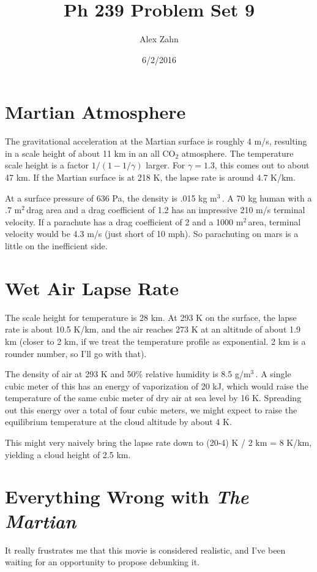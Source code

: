 \documentclass[12pt]{article}
\title{Ph 239 Problem Set 9}
\author{Alex Zahn}
\date{6/2/2016}
\begin{document}
\maketitle

\newcommand{\wmsq}{W/\(\mathrm{m}^2\,\)}
\newcommand{\msq}{\(\mathrm{m}^2\,\)}
\newcommand{\micron}{\(\mu\mathrm{m}\)\,}
\newcommand{\mcb}{\(\mathrm{m}^3\,\)}

\section{Martian Atmosphere}

The gravitational acceleration at the Martian surface is roughly 4 m/s, resulting in a scale height of about 11 km in an all CO\(_2\) atmosphere. The temperature scale height is a factor \(1/(1-1/\gamma)\) larger. For \(\gamma = 1.3\), this comes out to about 47 km. If the Martian surface is at 218 K, the lapse rate is around 4.7 K/km.

At a surface pressure of 636 Pa, the density is .015 kg \mcb. A 70 kg human with a .7 \msq drag area and a drag coefficient of 1.2 has an impressive 210 m/s terminal velocity. If a parachute has a drag coefficient of 2 and a 1000 \msq area, terminal velocity would be 4.3 m/s (just short of 10 mph). So parachuting on mars is a little on the inefficient side.

\section{Wet Air Lapse Rate}

The scale height for temperature is 28 km. At 293 K on the surface, the lapse rate is about 10.5 K/km, and the air reaches 273 K at an altitude of about 1.9 km (closer to 2 km, if we treat the temperature profile as exponential. 2 km is a rounder number, so I'll go with that).

The density of air at 293 K and 50\% relative humidity is 8.5 g/\mcb. A single cubic meter of this has an energy of vaporization of 20 kJ, which would raise the temperature of the same cubic meter of dry air at sea level by 16 K. Spreading out this energy over a total of four cubic meters, we might expect to raise the equilibrium temperature at the cloud altitude by about 4 K.

This might very naively bring the lapse rate down to (20-4) K / 2 km = 8 K/km, yielding a cloud height of 2.5 km.



\section{Everything Wrong with \textit{The Martian}}

It really frustrates me that this movie is considered realistic, and I've been waiting for an opportunity to propose debunking it.
\end{document}
